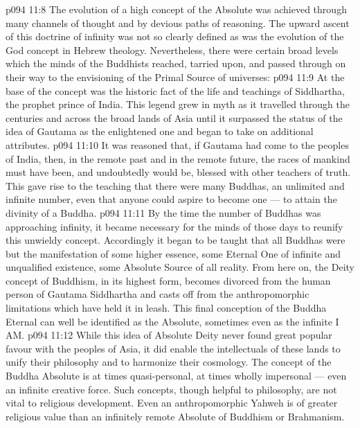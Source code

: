 \vs p094 11:8 The evolution of a high concept of the Absolute was achieved through many channels of thought and by devious paths of reasoning. The upward ascent of this doctrine of infinity was not so clearly defined as was the evolution of the God concept in Hebrew theology. Nevertheless, there were certain broad levels which the minds of the Buddhists reached, tarried upon, and passed through on their way to the envisioning of the Primal Source of universes:
\vs p094 11:9 \bibnobreakspace {} At the base of the concept was the historic fact of the life and teachings of Siddhartha, the prophet prince of India. This legend grew in myth as it travelled through the centuries and across the broad lands of Asia until it surpassed the status of the idea of Gautama as the enlightened one and began to take on additional attributes.
\vs p094 11:10 \bibnobreakspace {} It was reasoned that, if Gautama had come to the peoples of India, then, in the remote past and in the remote future, the races of mankind must have been, and undoubtedly would be, blessed with other teachers of truth. This gave rise to the teaching that there were many Buddhas, an unlimited and infinite number, even that anyone could aspire to become one --- to attain the divinity of a Buddha.
\vs p094 11:11 \bibnobreakspace {} By the time the number of Buddhas was approaching infinity, it became necessary for the minds of those days to reunify this unwieldy concept. Accordingly it began to be taught that all Buddhas were but the manifestation of some higher essence, some Eternal One of infinite and unqualified existence, some Absolute Source of all reality. From here on, the Deity concept of Buddhism, in its highest form, becomes divorced from the human person of Gautama Siddhartha and casts off from the anthropomorphic limitations which have held it in leash. This final conception of the Buddha Eternal can well be identified as the Absolute, sometimes even as the infinite I AM.
\vs p094 11:12 \pc While this idea of Absolute Deity never found great popular favour with the peoples of Asia, it did enable the intellectuals of these lands to unify their philosophy and to harmonize their cosmology. The concept of the Buddha Absolute is at times quasi\hyp{}personal, at times wholly impersonal --- even an infinite creative force. Such concepts, though helpful to philosophy, are not vital to religious development. Even an anthropomorphic Yahweh is of greater religious value than an infinitely remote Absolute of Buddhism or Brahmanism.
